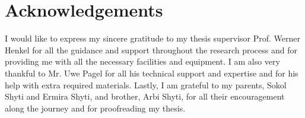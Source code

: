 \documentclass[a4paper,11pt,oneside]{article}
\begin{document}
  \newpage
  \section*{Acknowledgements}
  
  I would like to express my sincere gratitude to my thesis supervisor Prof. Werner Henkel for all the guidance and support throughout the research process and for providing me with all the necessary facilities and equipment. I am also very thankful to Mr. Uwe Pagel for all his technical support and expertise and for his help with extra required materials. Lastly, I am grateful to my parents, Sokol Shyti and Ermira Shyti, and brother, Arbi Shyti, for all their encouragement along the journey and for proofreading my thesis.  
\end{document}
